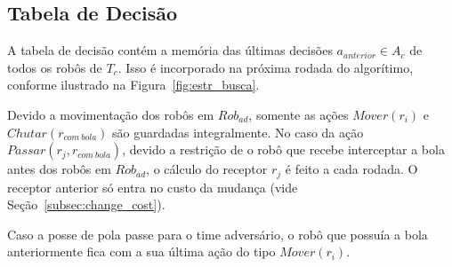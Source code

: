 \subsection{Tabela de Decisão}\label{sec:tab_dec}

A tabela de decisão contém a memória das últimas decisões $a_{anterior} \in A_c$
de todos os robôs de $T_c$.  Isso é incorporado na próxima rodada do algorítimo,
conforme ilustrado na Figura~\ref{fig:estr_busca}.


Devido a movimentação dos robôs em $Rob_{ad}$, somente as ações $Mover(r_i)$ e
$Chutar(r_{com{\ }bola})$ são guardadas integralmente. No caso da ação
$Passar(r_j, r_{com{\ }bola})$, devido a restrição de o robô que recebe
interceptar a bola antes dos robôs em $Rob_{ad}$, o cálculo do receptor $r_j$ é
feito a cada rodada. O receptor anterior só entra no custo da mudança (vide
Seção~\ref{subsec:change_cost}).

Caso a posse de pola passe para o time adversário, o robô que possuía a bola
anteriormente fica com a sua última ação do tipo $Mover(r_i)$.


